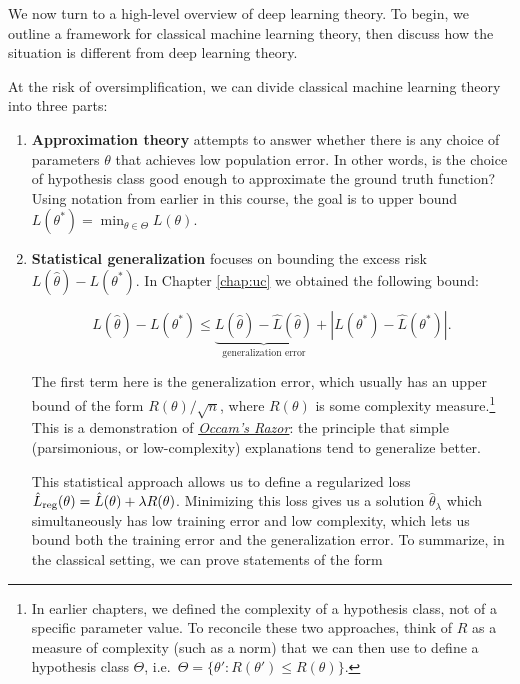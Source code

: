 \setcounter{section}{0}


We now turn to a high-level overview of deep learning theory. To begin, we outline a framework for classical machine learning theory, then discuss how the situation is different from deep learning theory.

At the risk of oversimplification, we can divide classical machine learning theory into three parts:

\begin{enumerate}
\item {\bf Approximation theory} attempts to answer whether there is any choice of parameters $\theta$ that achieves low population error. In other words, is the choice of hypothesis class good enough to approximate the ground truth function? Using notation from earlier in this course, the goal is to upper bound $L(\theta^*) = \min_{\theta \in \Theta} L(\theta).$
    
\item {\bf Statistical generalization} focuses on bounding the excess risk $L(\hat{\theta}) - L(\theta^*)$. In Chapter \ref{chap:uc} we obtained the following bound:
    
\begin{equation}
L(\hat{\theta})-L(\theta^*)\leq \underbrace{L(\hat{\theta})-\hat{L}(\hat{\theta})}_{\text{generalization error}} + |L(\theta^*)-\hat{L}(\theta^*)|.
\end{equation}
    
The first term here is the generalization error, which usually has an upper bound of the form $R(\theta)/\sqrt{n}$, where $R(\theta)$ is some complexity measure.\footnote{In earlier chapters, we defined the complexity of a hypothesis class, not of a specific parameter value. To reconcile these two approaches, think of $R$ as a measure of complexity (such as a norm) that we can then use to define a hypothesis class $\Theta$, i.e.~$\Theta = \{\theta' : R(\theta') \le R(\theta)\}$.} This is a demonstration of \href{https://en.wikipedia.org/wiki/Occam%27s_razor}{\textit{Occam's Razor}}: the principle that simple (parsimonious, or low-complexity) explanations tend to generalize better. 
    
This statistical approach allows us to define a regularized loss  $\hat{L}_{\textup{reg}}(\theta)=\hat{L}(\theta)+\lambda R(\theta)$. Minimizing this loss gives us a solution $\hat{\theta}_\lambda$ which simultaneously has low training error and low complexity, which lets us bound both the training error and the generalization error. To summarize, in the classical setting, we can prove statements of the form
    

\end{enumerate}
